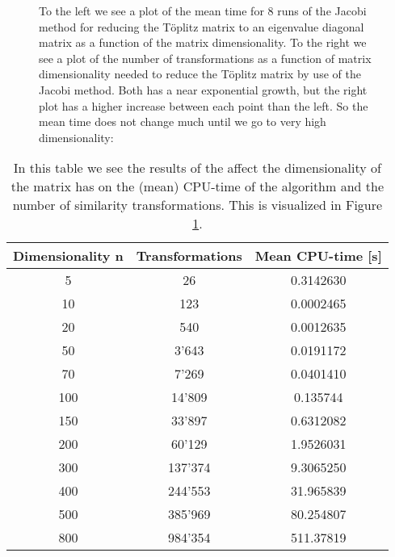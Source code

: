 \documentclass[12pt,a4paper,english]{article}
\begin{document}
\begin{figure}[htbp]
	\caption{To the left we see a plot of the mean time for 8 runs of the Jacobi method for reducing the Töplitz matrix to an eigenvalue diagonal matrix as a function of the matrix dimensionality. To the right we see a plot of the number of transformations as a function of matrix dimensionality needed to reduce the Töplitz matrix by use of the Jacobi method. Both has a near exponential growth, but the right plot has a higher increase between each point than the left. So the mean time does not change much until we go to very high dimensionality:\label{fig:time_transf}}
\end{figure}

\begin{table}[h!]
	\centering
	\begin{tabular}{ |c|c|c| }
		\hline \rule{0pt}{13pt}
		Dimensionality n & Transformations & Mean CPU-time [s] \\
		\hline \rule{0pt}{13pt}
		5 & 26 & 0.3142630 \\
		\hline \rule{0pt}{13pt}
		10 & 123 & 0.0002465 \\
		\hline \rule{0pt}{13pt}
		20 & 540 & 0.0012635 \\
		\hline \rule{0pt}{13pt}
		50 & 3'643 & 0.0191172 \\
		\hline \rule{0pt}{13pt}
		70 & 7'269 & 0.0401410 \\
		\hline \rule{0pt}{13pt}
		100 & 14'809 & 0.135744 \\
		\hline \rule{0pt}{13pt}
		150 & 33'897 & 0.6312082 \\
		\hline \rule{0pt}{13pt}
		200 & 60'129 & 1.9526031 \\
		\hline \rule{0pt}{13pt}
		300 & 137'374 & 9.3065250 \\
		\hline \rule{0pt}{13pt}
		400 & 244'553 & 31.965839 \\
		\hline \rule{0pt}{13pt}
		500 & 385'969 & 80.254807 \\
		\hline \rule{0pt}{13pt}
		800 & 984'354 & 511.37819 \\
		\hline
	\end{tabular}	
	\caption{In this table we see the results of the affect the dimensionality of the matrix has on the (mean) CPU-time of the algorithm and the number of similarity transformations. This is visualized in Figure \ref{fig:time_transf}.}
	\label{tab:ex_c}
\end{table}
\end{document}
